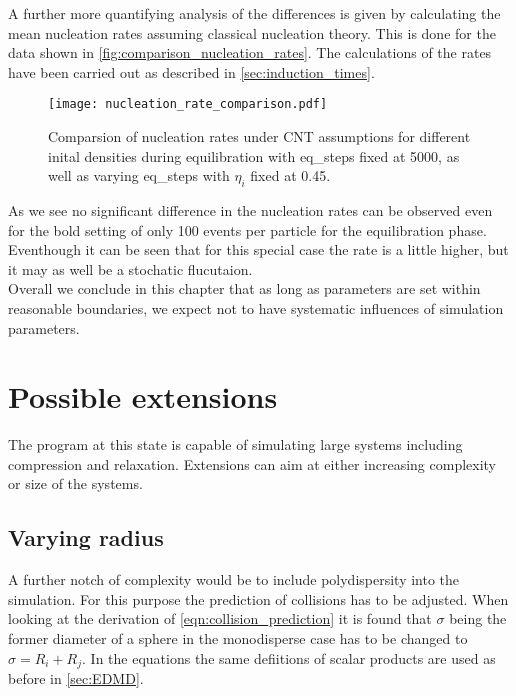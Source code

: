 A further more quantifying analysis of the differences is given by calculating the mean nucleation rates assuming classical nucleation theory. This is done for the data shown in \autoref{fig:comparison_nucleation_rates}. The calculations of the rates have been carried out as described in \autoref{sec:induction_times}.

\begin{figure}[h!]
\centering
\texttt{[image: nucleation\_rate\_comparison.pdf]}
\caption{Comparsion of nucleation rates under CNT assumptions for different inital densities during equilibration with eq\_steps fixed at 5000, as well as varying eq\_steps with $\eta_i$ fixed at 0.45. }
\label{fig:comparison_nucleation_rates}
\end{figure}

As we see no significant difference in the nucleation rates can be observed even for the bold setting of only 100 events per particle for the equilibration phase. Eventhough it can be seen that for this special case the rate is a little higher, but it may as well be a stochatic flucutaion.\\

Overall we conclude in this chapter that as long as parameters are set within reasonable boundaries, we expect not to have systematic influences of simulation parameters. 



\section{Possible extensions}
\label{sec:simulation_ext}
The program at this state is capable of simulating large systems including compression and relaxation. Extensions can aim at either increasing complexity or size of the systems. 

\subsection{Varying radius}
\label{sec:extension_radius}
A further notch of complexity would be to include polydispersity into the simulation. For this purpose the prediction of collisions has to be adjusted. When looking at the derivation of \autoref{eqn:collision_prediction} it is found that $\sigma$ being the former diameter of a sphere in the monodisperse case has to be changed to $\sigma=R_i+R_j$. In the equations the same defiitions of scalar products are used as before in \autoref{sec:EDMD}.

